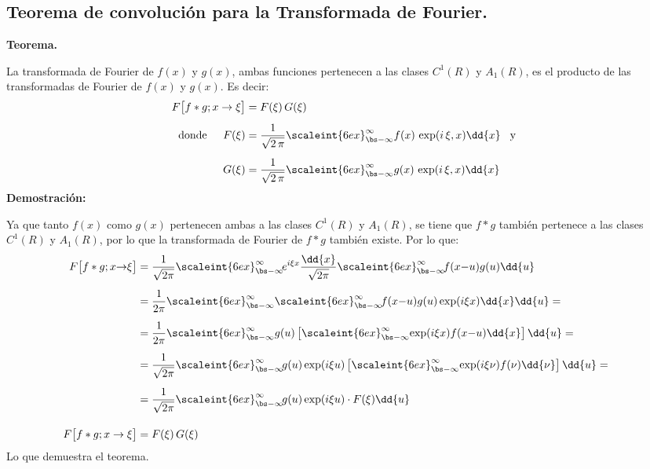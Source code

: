 \subsection{Teorema de convolución para la Transformada de Fourier.}

\textbf{Teorema.}

La transformada de Fourier de $f (x)$ y $g(x)$, ambas funciones pertenecen a las clases $C^{1}(R)$ y $A_{1}(R)$, es el producto de las transformadas de Fourier de $f (x)$ y $g(x)$. Es decir:
\begin{align*}
F \big[f * g; x \to \xi \big] &= F (\xi) \, G(\xi) \\[0.5em]
\mbox{donde } \hspace{0.4cm} F (\xi) &= \dfrac{1}{\sqrt{2 \, \pi}} \scaleint{6ex}_{\bs -\infty}^{\infty} f (x) \, \exp(i \, \xi, x) \dd{x} \hspace{0.3cm} \mbox{y} \\[0.5em]
G(\xi) &= \dfrac{1}{\sqrt{2 \, \pi}} \scaleint{6ex}_{\bs -\infty}^{\infty} g(x) \, \exp(i \, \xi, x) \dd{x}
\end{align*}
\textbf{Demostración: }

Ya que tanto $f (x)$ como $g(x)$ pertenecen ambas a las clases $C^{1}(R)$ y $A_{1}(R)$, se tiene que $f * g$ también pertenece a las clases $C^{1}(R)$ y $A_{1}(R)$, por lo que la transformada de Fourier de $f * g$ también existe. Por lo que:
\begin{align}
\hspace*{-0.5cm}
\begin{aligned}[b]
F \big[f * g; x {\to} \xi \big] &= \dfrac{1}{\sqrt{2 \pi}} \scaleint{6ex}_{\bs -\infty}^{\infty} \! e^{i  \xi x} \dfrac{\dd{x}}{\sqrt{2 \pi}} \scaleint{6ex}_{\bs -\infty}^{\infty} \! f(x {-} u) g(u) \dd{u} \\[0.5em]
&= \dfrac{1}{2 \pi} \scaleint{6ex}_{\bs -\infty}^{\infty} \scaleint{6ex}_{\bs -\infty}^{\infty} \! f(x {-} u) g(u) \exp(i \xi x) \dd{x} \dd{u} = \\[0.5em]
&= \dfrac{1}{2 \pi} \scaleint{6ex}_{\bs -\infty}^{\infty} g(u) \left[ \scaleint{6ex}_{\bs -\infty}^{\infty} \! \exp(i \xi x) f(x {-} u) \dd{x} \right] \dd{u} = \\[0.5em]
&= \dfrac{1}{\sqrt{2  \pi}} \scaleint{6ex}_{\bs -\infty}^{\infty} \! g(u) \exp(i \xi u) \left[ \scaleint{6ex}_{\bs -\infty}^{\infty} \! \exp(i \xi \nu) f(\nu) \dd{\nu} \right] \dd{u} = \\[0.5em]
&= \dfrac{1}{\sqrt{2 \pi}} \scaleint{6ex}_{\bs -\infty}^{\infty} \! g(u) \exp(i  \xi u) \cdot F (\xi) \dd{u} \\[1em]
F \big[f * g; x \to \xi \big] &= F (\xi) \, G(\xi)
\end{aligned}
\label{eq:ecuacion_01_24}
\end{align}
Lo que demuestra el teorema.
\\
\bigskip

